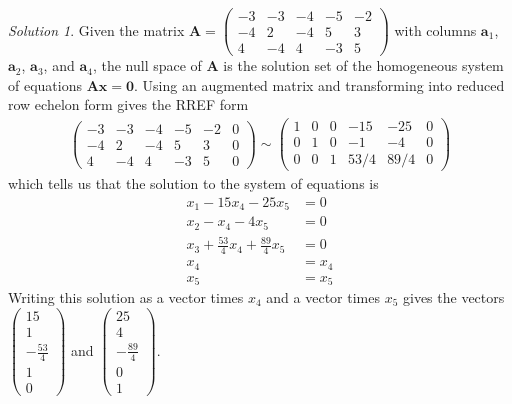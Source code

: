 \documentclass[
]{book}
\theoremstyle{definition}
\theoremstyle{definition}
\theoremstyle{definition}
\theoremstyle{definition}
\theoremstyle{remark}
\newtheorem*{solution}{Solution}
\begin{document}
\begin{solution}

Given the matrix \(\mathbf{A} = \begin{pmatrix} -3 & -3 & -4 & -5 & -2 \\ -4 & 2 & -4 & 5 & 3 \\ 4 & -4 & 4 & -3 & 5 \end{pmatrix}\) with columns \(\mathbf{a}_1\), \(\mathbf{a}_2\), \(\mathbf{a}_3\), and \(\mathbf{a}_4\), the null space of \(\mathbf{A}\) is the solution set of the homogeneous system of equations \(\mathbf{A} \mathbf{x} = \mathbf{0}\). Using an augmented matrix and transforming into reduced row echelon form gives the RREF form
\[
\begin{aligned}
\begin{pmatrix} -3 & -3 & -4 & -5 & -2 & 0 \\ -4 & 2 & -4 & 5 & 3 & 0 \\ 4 & -4 & 4 & -3 & 5 & 0 \end{pmatrix} \sim \begin{pmatrix} 1 & 0 & 0 & -15 & -25 & 0 \\ 0 & 1 & 0 & -1 & -4 & 0 \\ 0 & 0 & 1 & 53/4 & 89/4 & 0 \end{pmatrix}
\end{aligned}
\]
which tells us that the solution to the system of equations is
\[
\begin{aligned}
x_1 - 15 x_4 -25 x_5 & = 0 \\
x_2 - x_4 - 4 x_5 & = 0 \\
x_3 + \frac{53}{4} x_4  + \frac{89}{4} x_5 & = 0\\
x_4 & = x_4 \\
x_5 & = x_5
\end{aligned}
\]
Writing this solution as a vector times \(x_4\) and a vector times \(x_5\) gives the vectors \(\begin{pmatrix} 15 \\ 1 \\ -\frac{53}{4} \\ 1 \\ 0 \end{pmatrix}\) and \(\begin{pmatrix} 25 \\ 4 \\ -\frac{89}{4} \\ 0 \\ 1 \end{pmatrix}\).


\end{solution}
\end{document}
